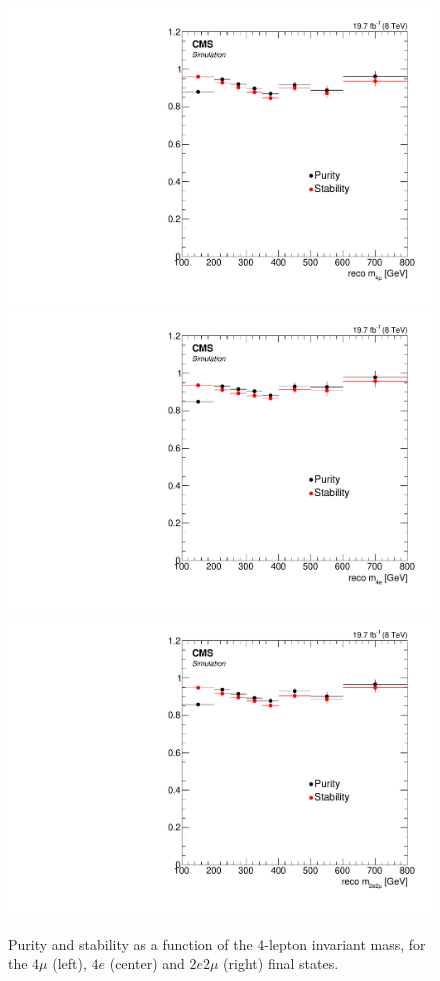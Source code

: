 \begin{figure}[hbtp]
  \begin{center}
    \includegraphics[width=0.8\cmsFigWidth]{Figures/Unfolding/BinMigration/PurityStability_4m_Mass_Pow}
    \includegraphics[width=0.8\cmsFigWidth]{Figures/Unfolding/BinMigration/PurityStability_4e_Mass_Pow}
    \includegraphics[width=0.8\cmsFigWidth]{Figures/Unfolding/BinMigration/PurityStability_2e2m_Mass_Pow}
    \caption{Purity and stability as a function of the 4-lepton invariant mass, for the $4\mu$ (left), $4e$ (center) and $2e2\mu$ (right) final states.}
    \label{fig:ps_mass}
  \end{center}
\end{figure}

